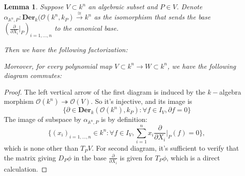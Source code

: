 \documentclass[12pt,a4paper,english]{article}
\theoremstyle{plain}
\newtheorem{lem}[thm]{Lemma}
\theoremstyle{definition}
\theoremstyle{remark}
\newcommand{\der}{\textbf{Der}}
\begin{document}
\begin{lem}
Suppose $V\subset k^{n}$ an algebraic subset and $P\in V$. Denote $\alpha_{\mathbb{A}^{n},P}:\der_{k}(\mathcal{O}(k^{n}, k_{P})\xrightarrow{\cong} k^{n}$ as the isomorphism that sends the base $(\frac{\partial}{\partial X_{i}}|_{P})_{i=1,...,n}$ to the canonical base.

Then we have the following factorization:

\begin{center}
\end{center}
Moreover, for every polynomial map $V\subset k^{n}\rightarrow W\subset k^{n}$, we have the following diagram commutes:

\begin{center}
\end{center}
\end{lem}
\begin{proof}
The left vertical arrow of the first diagram is induced by the $k-$algebra morphism $\mathcal{O}(k^{n})\twoheadrightarrow \mathcal{O}(V)$. So it's injective, and its image is 
\begin{equation*}
    \{\partial\in\der_{k}(\mathcal{O}(k^{n}),k_{P}):\forall f\in I_{V}, \partial f=0\}
\end{equation*}
The image of subspace by $\alpha_{\mathbb{A}^{n},P}$ is by definition:
\begin{equation*}
    \{(x_{i})_{i=1,...,n}\in k^{n}:\forall f\in I_{V}, \sum^{n}_{i=1}x_{i}\frac{\partial}{\partial X_{i}}|_{P}(f)=0  \},
\end{equation*}
which is none other than $T_{P}V$. For second diagram, it's sufficient to verify that the matrix giving $D_{P}\phi$ in the base $\frac{\partial}{\partial X_{i}}$ is given for $T_{P}\phi$, which is a direct calculation.
\end{proof}
\end{document}
